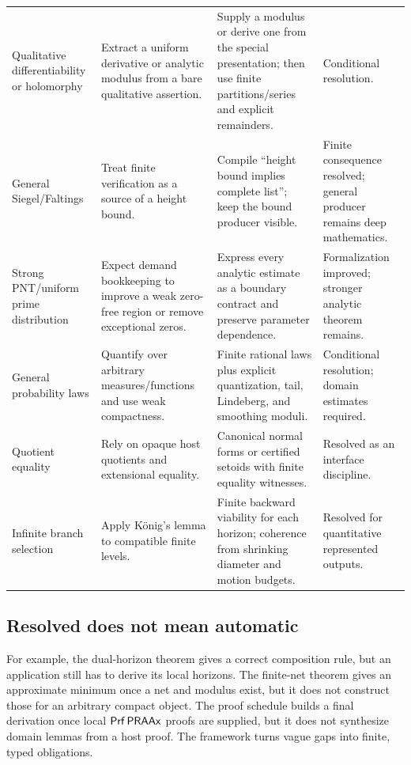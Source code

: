 \begin{longtable}{@{}p{}p{}p{}p{}@{}}
Qualitative differentiability or holomorphy & Extract a uniform derivative or analytic
modulus from a bare qualitative assertion. & Supply a modulus or derive one from the
special presentation; then use finite partitions/series and explicit remainders. &
Conditional resolution. \\
\addlinespace

General Siegel/Faltings & Treat finite verification as a source of a height bound. &
Compile ``height bound implies complete list''; keep the bound producer visible. &
Finite consequence resolved; general producer remains deep mathematics. \\
\addlinespace

Strong PNT/uniform prime distribution & Expect demand bookkeeping to improve a weak
zero-free region or remove exceptional zeros. & Express every analytic estimate as a
boundary contract and preserve parameter dependence. & Formalization improved; stronger
analytic theorem remains. \\
\addlinespace

General probability laws & Quantify over arbitrary measures/functions and use weak
compactness. & Finite rational laws plus explicit quantization, tail, Lindeberg, and
smoothing moduli. & Conditional resolution; domain estimates required. \\
\addlinespace

Quotient equality & Rely on opaque host quotients and extensional equality. & Canonical
normal forms or certified setoids with finite equality witnesses. & Resolved as an
interface discipline. \\
\addlinespace

Infinite branch selection & Apply K\"onig's lemma to compatible finite levels. & Finite
backward viability for each horizon; coherence from shrinking diameter and motion
budgets. & Resolved for quantitative represented outputs. \\
\bottomrule
\end{longtable}
\normalsize

\subsection{Resolved does not mean automatic}

For example, the dual-horizon theorem gives a correct composition rule, but an
application still has to derive its local horizons.  The finite-net theorem gives an
approximate minimum once a net and modulus exist, but it does not construct those for
an arbitrary compact object.  The proof schedule builds a final derivation once local
\(\mathsf{Prf}\,\mathsf{PRAAx}\) proofs are supplied, but it does not synthesize domain lemmas from a
host proof.  The framework turns vague gaps into finite, typed obligations.

